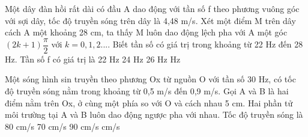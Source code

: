 \begin{ex}%
Một dây đàn hồi rất dài có đầu A dao động với tần số f theo phương vuông góc với sợi dây, tốc độ truyền sóng trên dây là 4,48 m/s. Xét một điểm M trên dây cách A một khoảng 28 cm, ta thấy M luôn dao động lệch pha với A một góc $\left(2k+1\right) \dfrac{\pi}{2}$ với $k=0, 1, 2...$. Biết tần số có giá trị trong khoảng từ 22 Hz đến 28 Hz. Tần số f có giá trị là
\choice
{22 Hz}
{24 Hz}
{26 Hz}
{ Hz}
\end{ex} 
\begin{ex}%
Một sóng hình sin truyền theo phương Ox từ nguồn O với tần số 30 Hz, có tốc độ truyền sóng nằm trong khoảng từ 0,5 m/s đến 0,9 m/s. Gọi A và B là hai điểm nằm trên Ox, ở cùng một phía so với O và cách nhau 5 cm. Hai phần tử môi trường tại A và B luôn dao động ngược pha với nhau. Tốc độ truyền sóng là
\choice
{80 cm/s}
{70 cm/s}
{90 cm/s}
{ cm/s}
\end{ex} 



